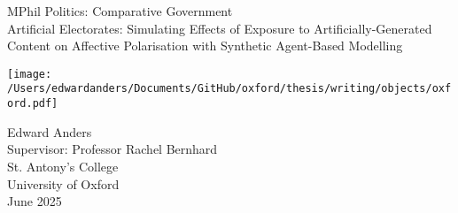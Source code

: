 \begin{titlepage}
\thispagestyle{empty}
\centering
\vspace*{6em}

{\LARGE MPhil Politics: Comparative Government \\[1em]}
{\LARGE Artificial Electorates: Simulating Effects of Exposure to Artificially-Generated Content on Affective Polarisation with Synthetic Agent-Based Modelling \\[2em]}


\vspace{3em}
\texttt{[image: /Users/edwardanders/Documents/GitHub/oxford/thesis/writing/objects/oxford.pdf]}
\vspace{4em}

{\Large Edward Anders \\[0.5em]}
Supervisor: Professor Rachel Bernhard \\[1em]
St. Antony's College \\
University of Oxford \\[1em]

June 2025

\vfill

\end{titlepage}
\newpage